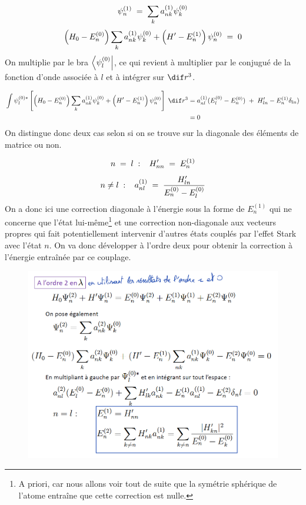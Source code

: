 \[
    \psi_n^{(1)} \; = \; \sum_k a_{nk}^{(1)} \psi_k^{(0)}
\]
\[
    \left(H_0 - E^{(0)}_n\right)\sum_k a_{nk}^{(1)} \psi_k^{(0)} + \left(H' - E^{(1)}_n\right)\psi_n^{(0)} \; = \; 0
\]
On multiplie par le bra $\bra{\psi^{(0)}_l}$, ce qui revient à multiplier par le conjugué de la fonction d'onde associée à $l$ et à intégrer sur $\dif r^3$.

\begin{align*}
    \int \psi^{(0)*}_l\left[ \left(H_0 - E^{(0)}_n\right)\sum_k a_{nk}^{(1)} \psi_k^{(0)} + \left(H' - E^{(1)}_n\right)\psi_n^{(0)}\right] \;\dif r^3 &= a^{(1)}_{nl}(E^{(0)}_l-E^{(0)}_n) \;+\; H'_{ln} - E^{(1)}_n\delta_{ln})\\
    &= 0
\end{align*}
On distingue donc deux cas selon si on se trouve sur la diagonale des éléments de matrice ou non.

\[
    n \; = \;  l\;:\;\;\; H'_{nn} \; = \; E^{(1)}_n
\]
\[
    n \neq l\;:\;\;\; a^{(1)}_{nl} \; = \; \dfrac{H'_{ln}}{E^{(0)}_n-E^{(0)}_l}
\]
On a donc ici une correction diagonale à l'énergie sous la forme de $E^{(1)}_n$ qui ne concerne que l'état lui-même\footnote{A priori, car nous allons voir tout de suite que la symétrie sphérique de l'atome entraîne que cette correction est nulle.} et une correction non-diagonale aux vecteurs propres qui fait potentiellement intervenir d'autres états couplés par l'effet Stark avec l'état $n$. On va donc développer à l'ordre deux pour obtenir la correction à l'énergie entraînée par ce couplage.\\

\begin{figure}[htp]
    \centering
    \includegraphics[scale=0.65]{Images2/ordre2.1.PNG}
\end{figure}

